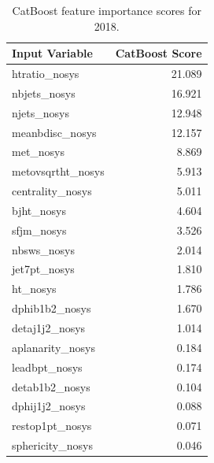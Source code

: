 \documentclass[twoside]{article}
\begin{document}
\begin{table}[htbp]
\centering
\begin{tabular}{l r}
\hline
\textbf{Input Variable} & \textbf{CatBoost Score} \\
\hline
htratio\_nosys       & 21.089 \\
nbjets\_nosys        & 16.921 \\
njets\_nosys         & 12.948 \\
meanbdisc\_nosys     & 12.157 \\
met\_nosys           & 8.869  \\
metovsqrtht\_nosys   & 5.913  \\
centrality\_nosys    & 5.011  \\
bjht\_nosys          & 4.604  \\
sfjm\_nosys          & 3.526  \\
nbsws\_nosys         & 2.014  \\
jet7pt\_nosys        & 1.810  \\
ht\_nosys            & 1.786  \\
dphib1b2\_nosys      & 1.670  \\
detaj1j2\_nosys      & 1.014  \\
aplanarity\_nosys    & 0.184  \\
leadbpt\_nosys       & 0.174  \\
detab1b2\_nosys      & 0.104  \\
dphij1j2\_nosys      & 0.088  \\
restop1pt\_nosys     & 0.071  \\
sphericity\_nosys    & 0.046  \\
\hline
\end{tabular}
\caption{CatBoost feature importance scores for 2018.}
\label{tab:catboost_scores_2018}
\end{table}
\end{document}
